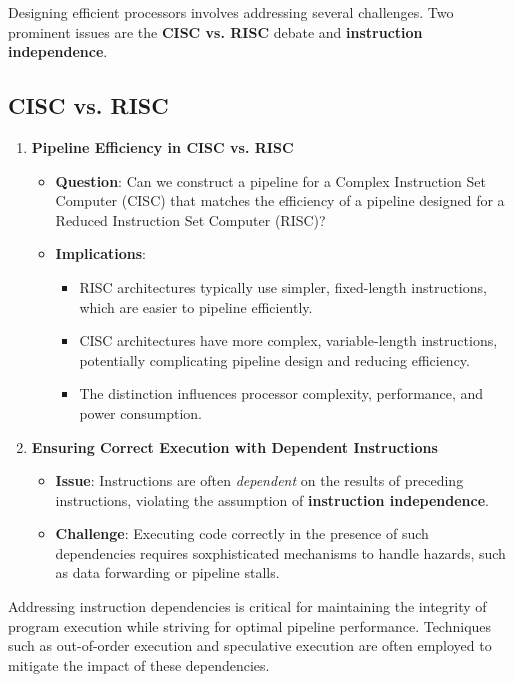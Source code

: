 Designing efficient processors involves addressing several challenges. Two prominent issues are the \textbf{CISC vs. RISC} debate and \textbf{instruction independence}.

\subsection{CISC vs. RISC}
\begin{enumerate}
    \item \textbf{Pipeline Efficiency in CISC vs. RISC}
    \begin{itemize}
        \item[] \textbf{Question}: Can we construct a pipeline for a Complex Instruction Set Computer (CISC) that matches the efficiency of a pipeline designed for a Reduced Instruction Set Computer (RISC)?
        \item[] \textbf{Implications}:
        \begin{itemize}
            \item RISC architectures typically use simpler, fixed-length instructions, which are easier to pipeline efficiently.
            \item CISC architectures have more complex, variable-length instructions, potentially complicating pipeline design and reducing efficiency.
            \item The distinction influences processor complexity, performance, and power consumption.
        \end{itemize}
    \end{itemize}
    \item \textbf{Ensuring Correct Execution with Dependent Instructions}
    \begin{itemize}
        \item \textbf{Issue}: Instructions are often \textit{dependent} on the results of preceding instructions, violating the assumption of \textbf{instruction independence}.
        \item \textbf{Challenge}: Executing code correctly in the presence of such dependencies requires soxphisticated mechanisms to handle hazards, such as data forwarding or pipeline stalls.
    \end{itemize}
\end{enumerate}

Addressing instruction dependencies is critical for maintaining the integrity of program execution while striving for optimal pipeline performance. Techniques such as out-of-order execution and speculative execution are often employed to mitigate the impact of these dependencies.
